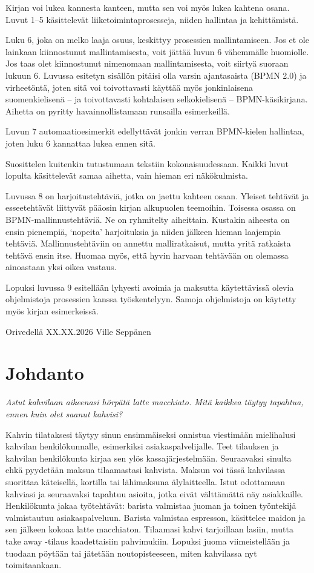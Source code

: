 \documentclass[
  finnish,
  letterpaper,
  DIV=11,
  numbers=noendperiod,
  oneside]{scrreprt}
\begin{document}
Kirjan voi lukea kannesta kanteen, mutta sen voi myös lukea kahtena
osana. Luvut 1--5 käsittelevät liiketoimintaprosesseja, niiden hallintaa
ja kehittämistä.

Luku 6, joka on melko laaja osuus, keskittyy prosessien mallintamiseen.
Jos et ole lainkaan kiinnostunut mallintamisesta, voit jättää luvun 6
vähemmälle huomiolle. Jos taas olet kiinnostunut nimenomaan
mallintamisesta, voit siirtyä suoraan lukuun 6. Luvussa esitetyn
sisällön pitäisi olla varsin ajantasaista (BPMN 2.0) ja virheetöntä,
joten sitä voi toivottavasti käyttää myös jonkinlaisena suomenkielisenä
-- ja toivottavasti kohtalaisen selkokielisenä -- BPMN-käsikirjana.
Aihetta on pyritty havainnollistamaan runsailla esimerkeillä.

Luvun 7 automaatioesimerkit edellyttävät jonkin verran BPMN-kielen
hallintaa, joten luku 6 kannattaa lukea ennen sitä.

Suosittelen kuitenkin tutustumaan tekstiin kokonaisuudessaan. Kaikki
luvut lopulta käsittelevät samaa aihetta, vain hieman eri näkökulmista.

Luvussa 8 on harjoitustehtäviä, jotka on jaettu kahteen osaan. Yleiset
tehtävät ja esseetehtävät liittyvät pääosin kirjan alkupuolen teemoihin.
Toisessa osassa on BPMN-mallinnustehtäviä. Ne on ryhmitelty aiheittain.
Kustakin aiheesta on ensin pienempiä, `nopeita' harjoituksia ja niiden
jälkeen hieman laajempia tehtäviä. Mallinnustehtäviin on annettu
malliratkaisut, mutta yritä ratkaista tehtävä ensin itse. Huomaa myös,
että hyvin harvaan tehtävään on olemassa ainoastaan yksi oikea vastaus.

Lopuksi luvussa 9 esitellään lyhyesti avoimia ja maksutta käytettävissä
olevia ohjelmistoja prosessien kanssa työskentelyyn. Samoja ohjelmistoja
on käytetty myös kirjan esimerkeissä.

Orivedellä XX.XX.2026 Ville Seppänen


\chapter{Johdanto}\label{johdanto}

\emph{Astut kahvilaan aikeenasi hörpätä latte macchiato. Mitä kaikkea
täytyy tapahtua, ennen kuin olet saanut kahvisi?}

Kahvin tilataksesi täytyy sinun ensimmäiseksi onnistua viestimään
mielihalusi kahvilan henkilökunnalle, esimerkiksi asiakaspalvelijalle.
Teet tilauksen ja kahvilan henkilökunta kirjaa sen ylös
kassajärjestelmään. Seuraavaksi sinulta ehkä pyydetään maksua
tilaamastasi kahvista. Maksun voi tässä kahvilassa suorittaa käteisellä,
kortilla tai lähimaksuna älylaitteella. Istut odottamaan kahviasi ja
seuraavaksi tapahtuu asioita, jotka eivät välttämättä näy asiakkaille.
Henkilökunta jakaa työtehtävät: barista valmistaa juoman ja toinen
työntekijä valmistautuu asiakaspalveluun. Barista valmistaa espresson,
käsittelee maidon ja sen jälkeen kokoaa latte macchiaton. Tilaamasi
kahvi tarjoillaan lasiin, mutta take away -tilaus kaadettaisiin
pahvimukiin. Lopuksi juoma viimeistellään ja tuodaan pöytään tai
jätetään noutopisteeseen, miten kahvilassa nyt toimitaankaan.
\end{document}
